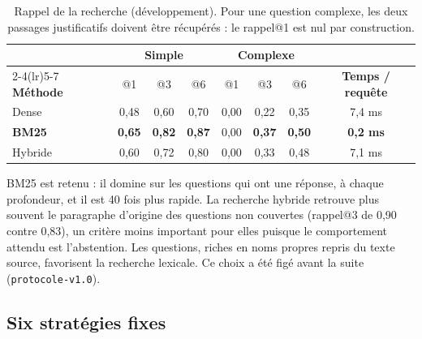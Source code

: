 \documentclass[11pt,a4paper]{article}
\begin{document}
\begin{table}[H]
\centering\small
\begin{tabular}{l c c c c c c c}
\toprule
& \multicolumn{3}{c}{\textbf{Simple}} & \multicolumn{3}{c}{\textbf{Complexe}} & \\
\cmidrule(lr){2-4}\cmidrule(lr){5-7}
\textbf{Méthode} & @1 & @3 & @6 & @1 & @3 & @6 & \textbf{Temps / requête} \\
\midrule
Dense   & 0,48 & 0,60 & 0,70 & 0,00 & 0,22 & 0,35 & 7,4 ms \\
\textbf{BM25} & \textbf{0,65} & \textbf{0,82} & \textbf{0,87} & 0,00 & \textbf{0,37} & \textbf{0,50} & \textbf{0,2 ms} \\
Hybride & 0,60 & 0,72 & 0,80 & 0,00 & 0,33 & 0,48 & 7,1 ms \\
\bottomrule
\end{tabular}
\caption{Rappel de la recherche (développement). Pour une question complexe, les deux passages
justificatifs doivent être récupérés : le rappel@1 est nul par construction.}
\label{tab:recherche}
\end{table}

BM25 est retenu : il domine sur les questions qui ont une réponse, à chaque profondeur, et il est
40 fois plus rapide. La recherche hybride retrouve plus souvent le paragraphe d'origine des questions
non couvertes (rappel@3 de 0,90 contre 0,83), un critère moins important pour elles puisque le
comportement attendu est l'abstention. Les questions, riches en noms propres repris du texte source,
favorisent la recherche lexicale. Ce choix a été figé avant la suite (\texttt{protocole-v1.0}).

\subsection{Six stratégies fixes}
\end{document}
